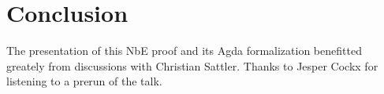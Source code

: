\documentclass[a4paper]{article}
\begin{document}


\section{Conclusion}

  The presentation of this NbE proof and its
Agda formalization benefitted greately from discussions with Christian
Sattler.  Thanks to Jesper Cockx for listening to a prerun of the talk.


%
\end{document}
